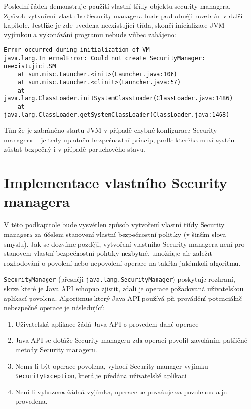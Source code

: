 Poslední řádek demonstruje použití vlastní třídy objektu security managera. Způsob vytvoření vlastního Security managera bude podrobněji rozebrán v další kapitole. Jestliže je zde uvedena neexistující třída, skončí inicializace JVM vyjímkou a vykonávání programu nebude vůbec zahájeno:

\begin{verbatim}
Error occurred during initialization of VM
java.lang.InternalError: Could not create SecurityManager: neexistujici.SM
    at sun.misc.Launcher.<init>(Launcher.java:106)
    at sun.misc.Launcher.<clinit>(Launcher.java:57)
    at java.lang.ClassLoader.initSystemClassLoader(ClassLoader.java:1486)
    at java.lang.ClassLoader.getSystemClassLoader(ClassLoader.java:1468)
\end{verbatim}

Tím že je zabráněno startu JVM v případě chybné konfigurace Security manageru -- je tedy uplatněn bezpečnostní princip, podle kterého musí systém zůstat bezpečný i v případě poruchového stavu.

\section{Implementace vlastního Security managera}

V této podkapitole bude vysvětlen způsob vytvoření vlastní třídy Security managera za účelem stanovení vlastní bezpečnostní politiky (v širším slova smyslu). Jak se dozvíme později, vytvoření vlastního Security managera není pro stanovení vlastní bezpečnostní politiky nezbytné, umožňuje ale založit rozhodování o povolení nebo nepovolení operace na takřka jakémkoli algoritmu.

{\tt SecurityManager} (přesněji {\tt java.lang.SecurityManager}) poskytuje rozhraní, skrze které je Java API schopno zjistit, zdali je operace požadovaná uživatelskou aplikací povolena. Algoritmus který Java API používá při provádění potenciálně nebezpečné operace je následující: \cite[4.1.1]{oaks}

\begin{enumerate}
  \item Uživatelská aplikace žádá Java API o provedení dané operace
  \item Java API se dotáže Security manageru zda operaci povolit zavoláním patřičné metody Security manageru.
  \item Nemá-li být operace povolena, vyhodí Security manager vyjímku {\tt SecurityException}, která je předána uživatelské aplikaci
  \item Není-li vyhozena žádná vyjímka, operace se považuje za povolenou a je provedena.
\end{enumerate}

